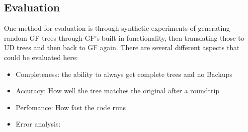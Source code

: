 \documentclass{article}
\begin{document}

\subsection{Evaluation}
One method for evaluation is through synthetic experiments of generating random GF trees through GF's built in functionality, then translating those to UD trees and then back to GF again. There are several different aspects that could be evaluated here:
\begin{itemize}
    \item Completeness: the ability to always get complete trees and no Backups
    \item Accuracy: How well the tree matches the original after a roundtrip
    \item Perfomance: How fast the code runs
    \item Error analysis: 
\end{itemize}
\end{document}
